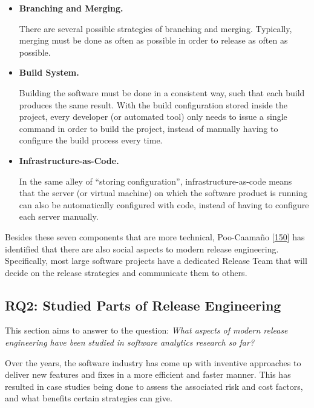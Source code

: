 \documentclass[]{book}
\begin{document}
\begin{itemize}
\item
  \textbf{Branching and Merging.}

  There are several possible strategies of branching and merging.
  Typically, merging must be done as often as possible in order to
  release as often as possible.
\item
  \textbf{Build System.}

  Building the software must be done in a consistent way, such that each
  build produces the same result. With the build configuration stored
  inside the project, every developer (or automated tool) only needs to
  issue a single command in order to build the project, instead of
  manually having to configure the build process every time.
\item
  \textbf{Infrastructure-as-Code.}

  In the same alley of ``storing configuration'', infrastructure-as-code
  means that the server (or virtual machine) on which the software
  product is running can also be automatically configured with code,
  instead of having to configure each server manually.
\end{itemize}

Besides these seven components that are more technical, Poo-Caamaño
{[}\protect\hyperlink{ref-poo-caamano2016a}{150}{]} has identified that
there are also social aspects to modern release engineering.
Specifically, most large software projects have a dedicated Release Team
that will decide on the release strategies and communicate them to
others.

\subsection{RQ2: Studied Parts of Release
Engineering}\label{rq2-studied-parts-of-release-engineering}

This section aims to answer to the question: \emph{What aspects of
modern release engineering have been studied in software analytics
research so far?}

Over the years, the software industry has come up with inventive
approaches to deliver new features and fixes in a more efficient and
faster manner. This has resulted in case studies being done to assess
the associated risk and cost factors, and what benefits certain
strategies can give.
\end{document}
